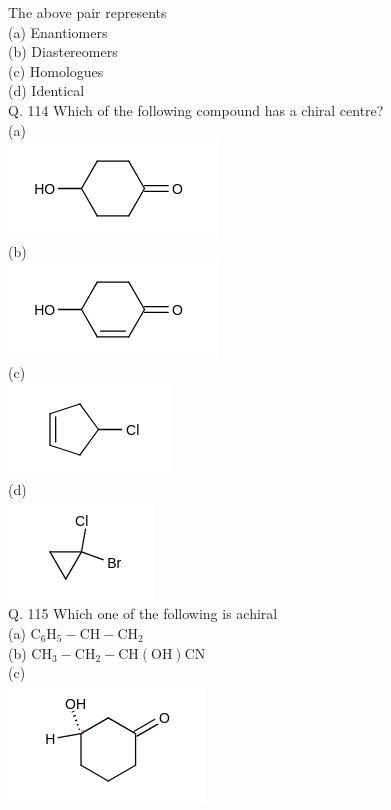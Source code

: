\documentclass[10pt]{article}
\begin{document}
The above pair represents\\
(a) Enantiomers\\
(b) Diastereomers\\
(c) Homologues\\
(d) Identical\\
Q. 114 Which of the following compound has a chiral centre?\\
(a)\\
\includegraphics{smile-7292dfb641b7297a87702f790bad8b3d2ab1fb0e}\\
(b)\\
\includegraphics{smile-4391f78c1b1c7c71119f0b77be527c5128713943}\\
(c)\\
\includegraphics{smile-6a722b7d5bcabd6481a75e3bc984b9bf4a7325a9}\\
(d)\\
\includegraphics{smile-1ac8ff6084d6ef71171d8cc8ea9506f0487a16ec}\\
Q. 115 Which one of the following is achiral\\
(a) $\mathrm{C}_{6} \mathrm{H}_{5}-\mathrm{CH}-\mathrm{CH}_{2}$\\
(b) $\mathrm{CH}_{3}-\mathrm{CH}_{2}-\mathrm{CH}(\mathrm{OH}) \mathrm{CN}$\\
(c)\\
\includegraphics{smile-ca2af03e6db2fe99f1499bdabaeb8c4b92e655e5}\\
\end{document}
